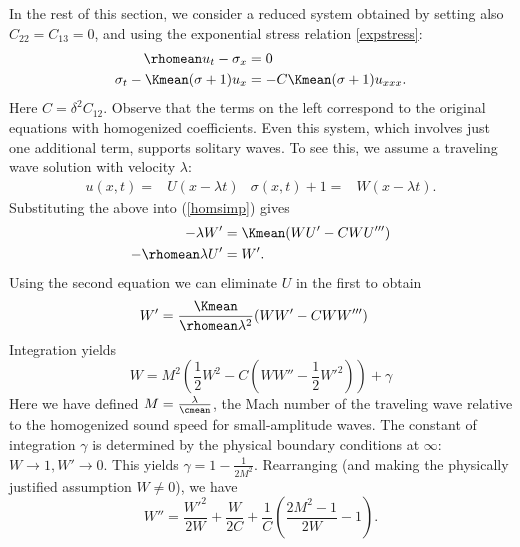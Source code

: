 In the rest of this section, we consider a reduced system obtained
by setting also $C_{22}=C_{13}=0$, and using the exponential
stress relation \eqref{expstress}:
\begin{subequations} \label{homsimp}
\begin{align}
\rhomean u_t - \sigma_x & = 0 \\
\sigma_t - \Kmean(\sigma+1)u_x & = - C\Kmean (\sigma+1)u_{xxx}.
\end{align}
\end{subequations}
Here $C=\delta^2 C_{12}$.
Observe that the terms on the left correspond to the original equations with 
homogenized coefficients.  Even this system, which involves just one additional
term, supports solitary waves.  To see this, we assume a traveling wave 
solution with velocity $\lambda$:
\begin{align*}
u(x,t) = & U(x-\lambda t) & \sigma(x,t)+1 = & W(x-\lambda t).
\end{align*}
Substituting the above into (\ref{homsimp}) gives
\begin{subequations}
\begin{align*}
-\lambda W' & = \Kmean (WU'-CWU''') \\
-\rhomean \lambda  U' & = W'.
\end{align*}
\end{subequations}
Using the second equation we can eliminate $U$ in the first to obtain
\begin{align*}
W' & = \frac{\Kmean }{\rhomean \lambda^2}(WW'-CWW''')
\end{align*}
Integration yields 
$$
W = M^2 \left( \frac{1}{2}W^2 - C\left(WW''-\frac{1}{2}W'^2\right) \right) + \gamma
$$
Here we have defined $M = \frac{\lambda}{\cmean}$, the Mach number of the 
traveling wave relative to the homogenized sound speed for small-amplitude
waves.
The constant of integration $\gamma$ is determined by the physical boundary
conditions at $\infty$: $W\rightarrow 1, W'\rightarrow 0$.  This yields
$ \gamma = 1-\frac{1}{2M^2}$.
Rearranging (and making the physically justified assumption $W\ne0$), we have
$$
W'' = \frac{W'^2}{2W} + \frac{W}{2C} + \frac{1}{C} \left(\frac{2M^2- 1}{2W}-1\right).
$$
